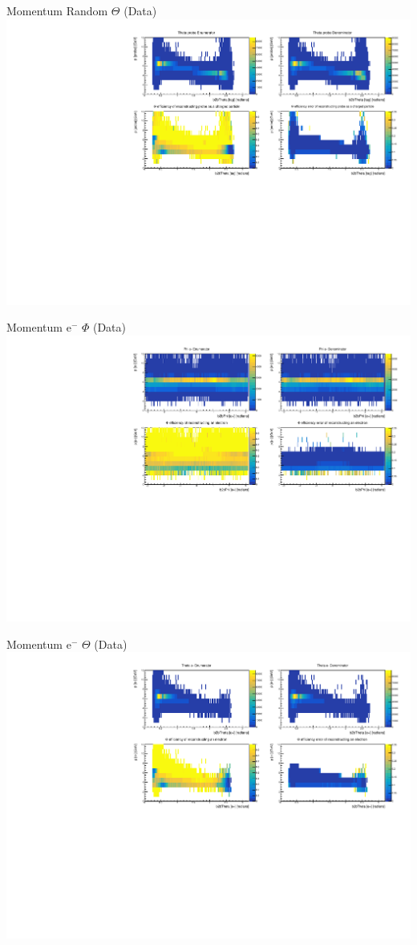 \documentclass[10pt]{beamer}
\begin{document}
\begin{frame}{Momentum Random $\Theta$ (Data)}
	\centering
	\includegraphics[width=\textwidth]{Momentum/MThetaRandom_Data}
\end{frame}
\begin{frame}{Momentum $\textrm{e}^-$ $\Phi$ (Data)}
	\centering
	\includegraphics[width=\textwidth]{Momentum/MPhiem_Data}
\end{frame}


\begin{frame}{Momentum $\textrm{e}^-$ $\Theta$ (Data)}
	\centering
	\includegraphics[width=\textwidth]{Momentum/MThetaem_Data}
\end{frame}
\end{document}
